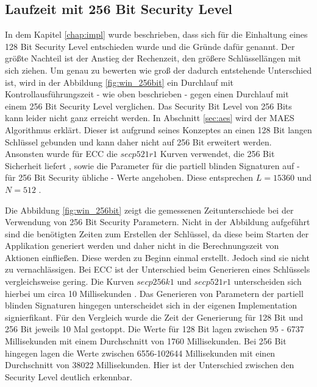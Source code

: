 \documentclass{scrreprt}
\begin{document}
\subsection{Laufzeit mit 256 Bit Security Level}
\label{subsec:runTime256Bit}
In dem Kapitel \ref{chap:impl} wurde beschrieben, dass sich für die Einhaltung eines 128 Bit Security Level entschieden wurde und die Gründe dafür genannt. Der größte Nachteil ist der Anstieg der Rechenzeit, den größere Schlüssellängen mit sich ziehen. Um genau zu bewerten wie groß der dadurch entstehende Unterschied ist, wird in der Abbildung \ref{fig:win_256bit} ein Durchlauf mit Kontrollausführungszeit - wie oben beschrieben - gegen einen Durchlauf mit einem 256 Bit Security Level verglichen.
Das Security Bit Level von 256 Bits kann leider nicht ganz erreicht werden. In Abschnitt \ref{sec:aes} wird der MAES Algorithmus erklärt. Dieser ist aufgrund seines Konzeptes an einen 128 Bit langen Schlüssel gebunden und kann daher nicht auf 256 Bit erweitert werden. Ansonsten wurde für ECC die $secp521r1$ Kurven verwendet, die 256 Bit Sicherheit liefert \cite{ecc-duka2020elliptic}, sowie die Parameter für die partiell blinden Signaturen auf - für 256 Bit Security übliche - Werte angehoben. Diese entsprechen $L=15360$ und $N=512$ \cite{elaine2016recommendation}.

Die Abbildung \ref{fig:win_256bit} zeigt die gemessenen Zeitunterschiede bei der Verwendung von 256 Bit Security Parametern. Nicht in der Abbildung aufgeführt sind die benötigten Zeiten zum Erstellen der Schlüssel, da diese beim Starten der Applikation generiert werden und daher nicht in die Berechnungszeit von Aktionen einfließen. Diese werden zu Beginn einmal erstellt. Jedoch sind sie nicht zu vernachlässigen. Bei ECC ist der Unterschied beim Generieren eines Schlüssels vergleichsweise gering. Die Kurven $secp256k1$ und $secp521r1$ unterscheiden sich hierbei um circa 10 Millisekunden \cite{ecc-duka2020elliptic}. Das Generieren von Parametern der partiell blinden Signaturen hingegen unterscheidet sich in der eigenen Implementation signierfikant. Für den Vergleich wurde die Zeit der Generierung für 128 Bit und 256 Bit jeweils 10 Mal gestoppt. Die Werte für 128 Bit lagen zwischen 95 - 6737 Millisekunden mit einem Durchschnitt von 1760 Millisekunden. Bei 256 Bit hingegen lagen die Werte zwischen 6556-102644 Millisekunden mit einen Durchschnitt von 38022 Millisekunden. Hier ist der Unterschied zwischen den Security Level deutlich erkennbar.
\end{document}
